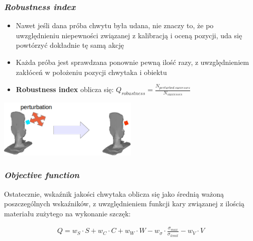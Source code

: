 \documentclass[12pt,a4paper,portrait]{beamer}
\begin{document}
\begin{frame}
\frametitle{\textit{Robustness index}}
\begin{itemize}
\item Nawet jeśli dana próba chwytu była udana, nie znaczy to, że po uwzględnieniu niepewności związanej z kalibracją i oceną pozycji, uda się powtórzyć dokładnie tę samą akcję
\item Każda próba jest sprawdzana ponownie pewną ilość razy, z uwzględnieniem zakłóceń w położeniu pozycji chwytaka i obiektu
\item \textbf{Robustness index} oblicza się: $Q_{robustness} = \frac{N_{perturbed\ successes}}{N_{successes}}$
\end{itemize}
\begin{center}
\includegraphics[width=0.5\textwidth]{images/robustness}
\end{center}
\end{frame}

\begin{frame}
\frametitle{\textit{Objective function}}
Ostatecznie, wskaźnik jakości chwytaka oblicza się jako średnią ważoną poszczególnych wskaźników, z uwzględnieniem funkcji kary związanej z ilością materiału zużytego na wykonanie szczęk:


\begin{align*}
Q = w_S \cdot S + w_C \cdot C + w_W \cdot W - w_\sigma \cdot \frac{\sigma_{max}}{\sigma_{limit}} - w_V \cdot V
\end{align*}
\end{frame}
\end{document}
